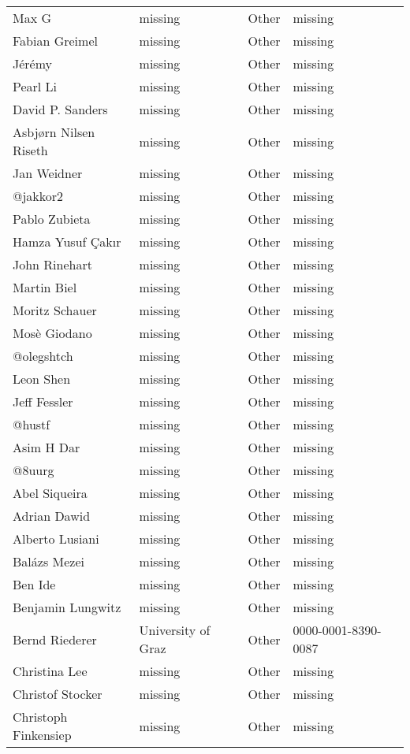 \begin{longtable}{p{4cm}p{4cm}ll}
  Max G & missing & Other & missing \\
  Fabian Greimel & missing & Other & missing \\
  Jérémy & missing & Other & missing \\
  Pearl Li & missing & Other & missing \\
  David P. Sanders & missing & Other & missing \\
  Asbjørn Nilsen Riseth & missing & Other & missing \\
  Jan Weidner & missing & Other & missing \\
  @jakkor2 & missing & Other & missing \\
  Pablo Zubieta & missing & Other & missing \\
  Hamza Yusuf Çakır & missing & Other & missing \\
  John Rinehart & missing & Other & missing \\
  Martin Biel & missing & Other & missing \\
  Moritz Schauer & missing & Other & missing \\
  Mosè Giodano & missing & Other & missing \\
  @olegshtch & missing & Other & missing \\
  Leon Shen & missing & Other & missing \\
  Jeff Fessler & missing & Other & missing \\
  @hustf & missing & Other & missing \\
  Asim H Dar & missing & Other & missing \\
  @8uurg & missing & Other & missing \\
  Abel Siqueira & missing & Other & missing \\
  Adrian Dawid & missing & Other & missing \\
  Alberto Lusiani & missing & Other & missing \\
  Balázs Mezei & missing & Other & missing \\
  Ben Ide & missing & Other & missing \\
  Benjamin Lungwitz & missing & Other & missing \\
  Bernd Riederer & University of Graz & Other & 0000-0001-8390-0087 \\
  Christina Lee & missing & Other & missing \\
  Christof Stocker & missing & Other & missing \\
  Christoph Finkensiep & missing & Other & missing \\

\end{longtable}
